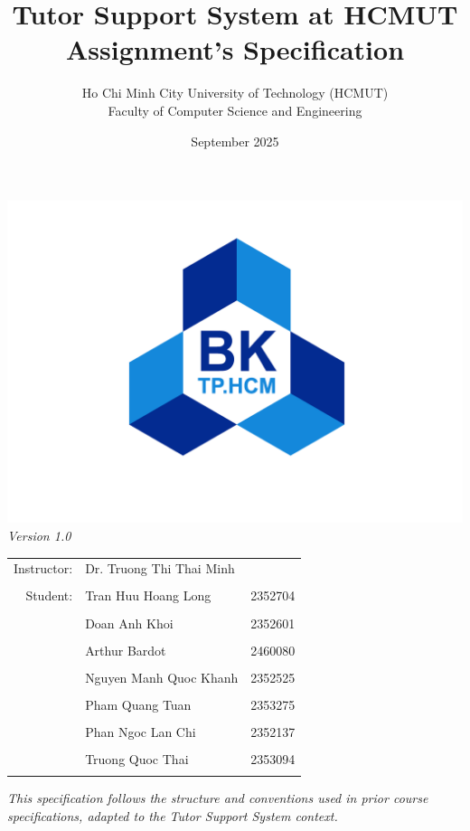 \documentclass[12pt,a4paper]{article}
\title{\textbf{Tutor Support System at HCMUT}\\[2pt] \large Assignment's Specification}
\author{Ho Chi Minh City University of Technology (HCMUT)\\Faculty of Computer Science and Engineering}
\date{September 2025}
\begin{document}
\maketitle

\begin{center}
\includegraphics[width=0.4\linewidth]{images/hcmut-logo-placeholder.png}\\[6pt]
\textit{Version 1.0}

\vspace{1.5cm}

\end{center}

\begin{center}
\begin{tabular}{rll}
Instructor: & Dr. Truong Thi Thai Minh           &  \\
\\
Student:    & Tran Huu Hoang Long    & 2352704 \\
\\
            & Doan Anh Khoi       &   2352601 \\
\\
            & Arthur Bardot          &   2460080 \\
\\
            & Nguyen Manh Quoc Khanh       &   2352525 \\
\\
            & Pham Quang Tuan       &   2353275 \\
\\
            & Phan Ngoc Lan Chi       &   2352137 \\
\\
            & Truong Quoc Thai     &   2353094 \\
\\
\end{tabular}
\end{center}

\vfill
\begin{center}
\textit{This specification follows the structure and conventions used in prior course specifications, adapted to the Tutor Support System context.}
\end{center}
\newpage
{}
\tableofcontents
\newpage
\end{document}
